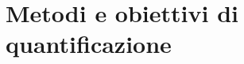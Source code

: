 \documentclass[../main]{subfiles}
\begin{document}
\section{Metodi e obiettivi di quantificazione}
\end{document}
